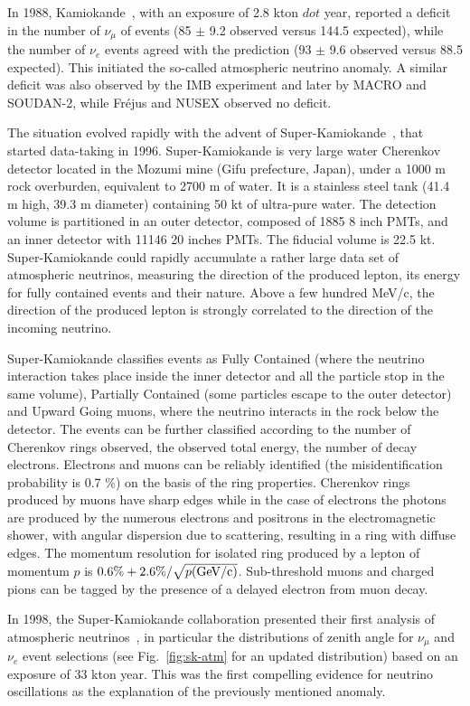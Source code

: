 In 1988, Kamiokande~\cite{kam88}, with an exposure of 2.8 kton $dot$ year, reported a deficit in the number of $\nu_\mu$ of events (85 $\pm$ 9.2 observed versus 144.5 expected), while the number of $\nu_e$ events agreed with the prediction (93 $\pm$ 9.6 observed versus 88.5 expected). 
This initiated the so-called atmospheric neutrino anomaly. A similar deficit was also observed by the IMB experiment and later by MACRO and SOUDAN-2, while Fr\'ejus and NUSEX observed no deficit. 

The situation evolved rapidly with the advent of Super-Kamiokande~\cite{sknim}, that started data-taking in 1996. Super-Kamiokande is very large water Cherenkov detector located in the Mozumi mine (Gifu prefecture, Japan), under a 1000 m rock overburden, equivalent to 2700 m of water. It is a stainless steel tank (41.4 m high, 39.3 m diameter) containing 50 kt of ultra-pure water. The detection volume is partitioned in an outer detector, composed of 1885 8 inch PMTs, and an inner detector with 11146 20 inches PMTs. The fiducial volume is 22.5 kt. Super-Kamiokande could rapidly accumulate a rather large data set of atmospheric neutrinos, measuring the direction of the produced lepton, its energy for fully contained events and their nature. Above a few hundred MeV/c, the direction of the produced lepton is strongly correlated to the direction of the incoming neutrino.

Super-Kamiokande classifies events as Fully Contained (where the neutrino interaction takes place inside the inner detector and all the particle stop in the same volume), Partially Contained (some particles escape to the outer detector) and Upward Going muons, where the neutrino interacts in the rock below the detector. The events can be further classified according to the number of Cherenkov rings observed, the observed total energy, the number of decay electrons. Electrons and muons can be reliably identified (the misidentification probability is 0.7 \%) on the basis of the ring properties. Cherenkov rings produced by muons have sharp edges while in the case of electrons the photons are produced by the numerous electrons and positrons in the electromagnetic shower, with angular dispersion due to scattering, resulting in a ring with diffuse edges. The momentum resolution for isolated ring produced by a lepton of momentum $p$ is $0.6\% +2.6\%/\sqrt{p ({\rm GeV/c})}$. Sub-threshold muons and charged pions can be tagged by the presence of a delayed electron from muon decay.

In 1998, the Super-Kamiokande collaboration presented their first analysis of atmospheric neutrinos~\cite{Fukuda:1998mi}, in particular the distributions of zenith angle for $ \nu_\mu$ and $\nu_e$ event selections (see Fig.~\ref{fig:sk-atm} for an updated distribution) based on an exposure of 33 kton year. This was the first compelling evidence for neutrino oscillations as the explanation of the previously mentioned anomaly.  

